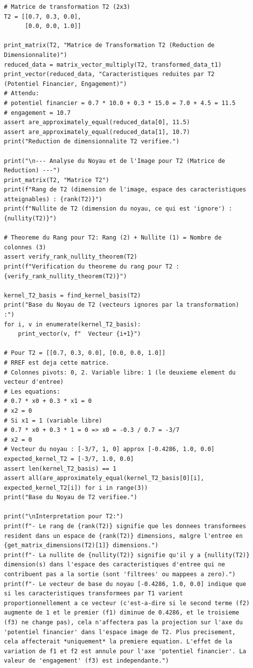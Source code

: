 \documentclass{report}
\begin{document}
\begin{verbatim}
# Matrice de transformation T2 (2x3)
T2 = [[0.7, 0.3, 0.0],
      [0.0, 0.0, 1.0]]

print_matrix(T2, "Matrice de Transformation T2 (Reduction de Dimensionnalite)")
reduced_data = matrix_vector_multiply(T2, transformed_data_t1)
print_vector(reduced_data, "Caracteristiques reduites par T2 (Potentiel Financier, Engagement)")
# Attendu:
# potentiel financier = 0.7 * 10.0 + 0.3 * 15.0 = 7.0 + 4.5 = 11.5
# engagement = 10.7
assert are_approximately_equal(reduced_data[0], 11.5)
assert are_approximately_equal(reduced_data[1], 10.7)
print("Reduction de dimensionnalite T2 verifiee.")

print("\n--- Analyse du Noyau et de l'Image pour T2 (Matrice de Reduction) ---")
print_matrix(T2, "Matrice T2")
print(f"Rang de T2 (dimension de l'image, espace des caracteristiques atteignables) : {rank(T2)}")
print(f"Nullite de T2 (dimension du noyau, ce qui est 'ignore') : {nullity(T2)}")

# Theoreme du Rang pour T2: Rang (2) + Nullite (1) = Nombre de colonnes (3)
assert verify_rank_nullity_theorem(T2)
print(f"Verification du theoreme du rang pour T2 : {verify_rank_nullity_theorem(T2)}")

kernel_T2_basis = find_kernel_basis(T2)
print("Base du Noyau de T2 (vecteurs ignores par la transformation) :")
for i, v in enumerate(kernel_T2_basis):
    print_vector(v, f"  Vecteur {i+1}")

# Pour T2 = [[0.7, 0.3, 0.0], [0.0, 0.0, 1.0]]
# RREF est deja cette matrice.
# Colonnes pivots: 0, 2. Variable libre: 1 (le deuxieme element du vecteur d'entree)
# Les equations:
# 0.7 * x0 + 0.3 * x1 = 0
# x2 = 0
# Si x1 = 1 (variable libre)
# 0.7 * x0 + 0.3 * 1 = 0 => x0 = -0.3 / 0.7 = -3/7
# x2 = 0
# Vecteur du noyau : [-3/7, 1, 0] approx [-0.4286, 1.0, 0.0]
expected_kernel_T2 = [-3/7, 1.0, 0.0]
assert len(kernel_T2_basis) == 1
assert all(are_approximately_equal(kernel_T2_basis[0][i], expected_kernel_T2[i]) for i in range(3))
print("Base du Noyau de T2 verifiee.")

print("\nInterpretation pour T2:")
print(f"- Le rang de {rank(T2)} signifie que les donnees transformees resident dans un espace de {rank(T2)} dimensions, malgre l'entree en {get_matrix_dimensions(T2)[1]} dimensions.")
print(f"- La nullite de {nullity(T2)} signifie qu'il y a {nullity(T2)} dimension(s) dans l'espace des caracteristiques d'entree qui ne contribuent pas a la sortie (sont 'filtrees' ou mappees a zero).")
print(f"- Le vecteur de base du noyau [-0.4286, 1.0, 0.0] indique que si les caracteristiques transformees par T1 varient proportionnellement a ce vecteur (c'est-a-dire si le second terme (f2) augmente de 1 et le premier (f1) diminue de 0.4286, et le troisieme (f3) ne change pas), cela n'affectera pas la projection sur l'axe du 'potentiel financier' dans l'espace image de T2. Plus precisement, cela affecterait *uniquement* la premiere equation. L'effet de la variation de f1 et f2 est annule pour l'axe 'potentiel financier'. La valeur de 'engagement' (f3) est independante.")


\end{verbatim}
\end{document}
